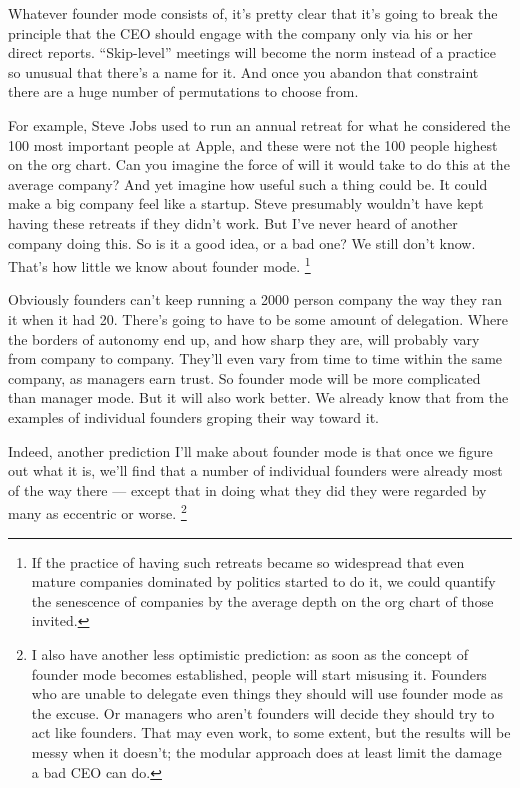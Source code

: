 \documentclass[12pt]{book}
\begin{document}
Whatever founder mode consists of, it's pretty clear that it's going to
break the principle that the CEO should engage with the company only via
his or her direct reports. ``Skip-level'' meetings will become the norm
instead of a practice so unusual that there's a name for it. And once
you abandon that constraint there are a huge number of permutations to
choose from.

For example, Steve Jobs used to run an annual retreat for what he
considered the 100 most important people at Apple, and these were not
the 100 people highest on the org chart. Can you imagine the force of
will it would take to do this at the average company? And yet imagine
how useful such a thing could be. It could make a big company feel like
a startup. Steve presumably wouldn't have kept having these retreats if
they didn't work. But I've never heard of another company doing this. So
is it a good idea, or a bad one? We still don't know. That's how little
we know about founder mode. \footnote{If the practice of having such retreats became so widespread
that even mature companies dominated by politics started to do it, we
could quantify the senescence of companies by the average depth on the
org chart of those invited.}

Obviously founders can't keep running a 2000 person company the way they
ran it when it had 20. There's going to have to be some amount of
delegation. Where the borders of autonomy end up, and how sharp they
are, will probably vary from company to company. They'll even vary from
time to time within the same company, as managers earn trust. So founder
mode will be more complicated than manager mode. But it will also work
better. We already know that from the examples of individual founders
groping their way toward it.

Indeed, another prediction I'll make about founder mode is that once we
figure out what it is, we'll find that a number of individual founders
were already most of the way there --- except that in doing what they
did they were regarded by many as eccentric or worse.
\footnote{I also have another less optimistic prediction: as soon as the
concept of founder mode becomes established, people will start misusing
it. Founders who are unable to delegate even things they should will use
founder mode as the excuse. Or managers who aren't founders will decide
they should try to act like founders. That may even work, to some
extent, but the results will be messy when it doesn't; the modular
approach does at least limit the damage a bad CEO can do.}
\end{document}
